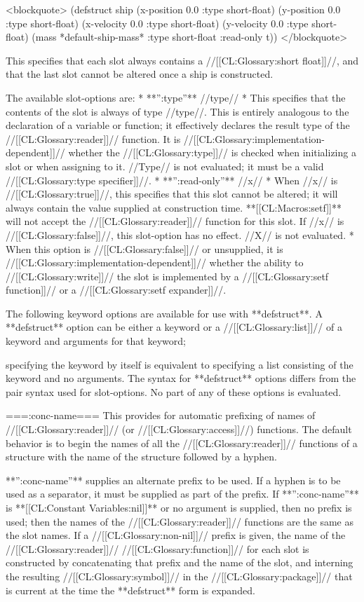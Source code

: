 <blockquote> 
(defstruct ship 
  (x-position 0.0 :type short-float) 
  (y-position 0.0 :type short-float) 
  (x-velocity 0.0 :type short-float) 
  (y-velocity 0.0 :type short-float) 
  (mass *default-ship-mass* :type short-float :read-only t)) 
</blockquote> 

This specifies that each slot always contains a //[[CL:Glossary:short float]]//, and that the last slot cannot be altered once a ship is constructed.

The available slot-options are: 
  * **'':type''** //type//
    * This specifies that the contents of the slot is always of type //type//. This is entirely analogous to the declaration of a variable or function; it effectively declares the result type of the //[[CL:Glossary:reader]]// function. It is //[[CL:Glossary:implementation-dependent]]// whether the //[[CL:Glossary:type]]// is checked when initializing a slot or when assigning to it. //Type// is not evaluated; it must be a valid //[[CL:Glossary:type specifier]]//.
  * **'':read-only''** //x//
    * When //x// is //[[CL:Glossary:true]]//, this specifies that this slot cannot be altered; it will always contain the value supplied at construction time. **[[CL:Macros:setf]]** will not accept the //[[CL:Glossary:reader]]// function for this slot. If //x// is //[[CL:Glossary:false]]//, this slot-option has no effect. //X// is not evaluated.
    * When this option is //[[CL:Glossary:false]]// or unsupplied, it is //[[CL:Glossary:implementation-dependent]]// whether the ability to //[[CL:Glossary:write]]// the slot is implemented by a //[[CL:Glossary:setf function]]// or a //[[CL:Glossary:setf expander]]//.

The following keyword options are available for use with **defstruct**. A **defstruct** option can be either a keyword or a //[[CL:Glossary:list]]// of a keyword and arguments for that keyword;

specifying the keyword by itself is equivalent to specifying a list consisting of the keyword and no arguments. The syntax for **defstruct** options differs from the pair syntax used for slot-options. No part of any of these options is evaluated.

===:conc-name===
This provides for automatic prefixing of names of //[[CL:Glossary:reader]]// (or //[[CL:Glossary:access]]//) functions. The default behavior is to begin the names of all the //[[CL:Glossary:reader]]// functions of a structure with the name of the structure followed by a hyphen.

**'':conc-name''** supplies an alternate prefix to be used. If a hyphen is to be used as a separator, it must be supplied as part of the prefix. If **'':conc-name''** is **[[CL:Constant Variables:nil]]** or no argument is supplied, then no prefix is used; then the names of the //[[CL:Glossary:reader]]// functions are the same as the slot names. If a //[[CL:Glossary:non-nil]]// prefix is given, the name of the //[[CL:Glossary:reader]]// //[[CL:Glossary:function]]// for each slot is constructed by concatenating that prefix and the name of the slot, and interning the resulting //[[CL:Glossary:symbol]]// in the //[[CL:Glossary:package]]// that is current at the time the **defstruct** form is expanded.

